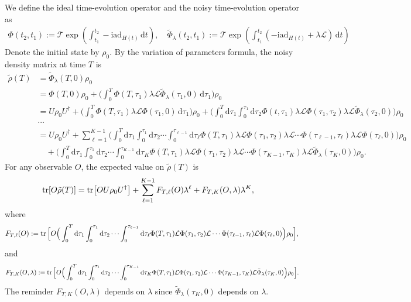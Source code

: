 \documentclass[11pt]{article}
\renewcommand{\i}{\mathrm{i}}
\renewcommand{\d}{\mathrm{d}}
\renewcommand{\L}{\mathcal{L}}
\newcommand{\ad}{\mathrm{ad}}
\newcommand{\T}{\mathcal{T}}
\newcommand{\B}{\Big}
\begin{document}
We define the ideal time-evolution operator and the noisy time-evolution operator as \begin{align*}
    \Phi(t_2,t_1):=\T \exp(\int_{t_1}^{t_2} -\i\ad_{H(t)}\,\d t),\quad \tilde{\Phi}_{\lambda}(t_2, t_1):=\T \exp(\int_{t_1}^{t_2}(-\i \ad_{H(t)}+\lambda \L)\,\d t)
\end{align*} Denote the initial state by $\rho_0$. By the variation of parameters formula, the noisy density matrix at time $T$ is \begin{align*}
    \tilde{\rho}(T) &= \tilde{\Phi}_{\lambda}(T,0)\rho_0\\
    &=\Phi(T,0)\rho_0+\B(\int_{0}^T \Phi(T, \tau_1)\lambda \L\tilde{\Phi}_{\lambda}(\tau_1, 0)\, \d \tau_1\B)\rho_0 \\
    & = U\rho_0U^{\dagger} + \B(\int_{0}^T \Phi(T, \tau_1)\lambda \L\Phi(\tau_1, 0)\, \d \tau_1\B)\rho_0 + \B(\int_{0}^T\d \tau_1 \int_{0}^{\tau_1}\d \tau_2 \Phi(t, \tau_1)\lambda \L\Phi(\tau_1, \tau_2)\lambda \L\tilde{\Phi}_{\lambda}(\tau_2,0)\B)\rho_0\\
    &\cdots \\
    &=U\rho_0U^{\dagger}+
    \sum_{\ell=1}^{K-1}\B(\int_{0}^T \d \tau_1 \int_{0}^{\tau_1}\d \tau_2 \cdots \int_{0}^{\tau_{\ell-1}} \d \tau_{\ell} \Phi(T, \tau_1)\lambda \L \Phi(\tau_1, \tau_2)\lambda \L \cdots \Phi(\tau_{\ell-1}, \tau_{\ell})\lambda \L\Phi(\tau_{\ell},0)\B)\rho_0\\
    &\quad+\B(\int_{0}^T \d \tau_1 \int_{0}^{\tau_1}\d \tau_2 \cdots \int_{0}^{\tau_{K-1}} \d \tau_{K} \Phi(T, \tau_1)\lambda \L \Phi(\tau_1, \tau_2)\lambda \L \cdots \Phi(\tau_{K-1}, \tau_{K})\lambda \L\tilde{\Phi}_{\lambda}(\tau_{K},0)\B)\rho_0.
\end{align*}
For any observable $O$, the expected value on $\tilde{\rho}(T)$ is \begin{align}
\label{eq:expansion-lambda}
    \tr[O\tilde{\rho}(T)] &= \tr[OU\rho_0 U^{\dagger}]+
    \sum_{\ell=1}^{K-1}F_{T,\ell}(O)\lambda^{\ell}+F_{T,K}(O,\lambda)\lambda^K,
\end{align}
where \begin{align*}
    F_{T,\ell}(O):=\tr\B[O\B(\int_{0}^T \d \tau_1 \int_{0}^{\tau_1}\d \tau_2 \cdots \int_{0}^{\tau_{\ell-1}} \d \tau_{\ell} \Phi(T, \tau_1) \L \Phi(\tau_1, \tau_2) \L \cdots \Phi(\tau_{\ell-1}, \tau_{\ell}) \L\Phi(\tau_{\ell},0)\B)\rho_0\Big],
\end{align*}
and \begin{align*}
    F_{T,K}(O,\lambda):=\tr\B[O\B(\int_{0}^T \d \tau_1 \int_{0}^{\tau_1}\d \tau_2 \cdots \int_{0}^{\tau_{K-1}} \d \tau_{K} \Phi(T, \tau_1) \L \Phi(\tau_1, \tau_2) \L \cdots \Phi(\tau_{K-1}, \tau_{K}) \L\tilde{\Phi}_{\lambda}(\tau_{K},0)\B)\rho_0\B].
\end{align*}
The reminder $F_{T,K}(O,\lambda)$ depends on $\lambda$ since $\tilde{\Phi}_{\lambda}(\tau_K,0)$ depends on $\lambda$.
\end{document}
